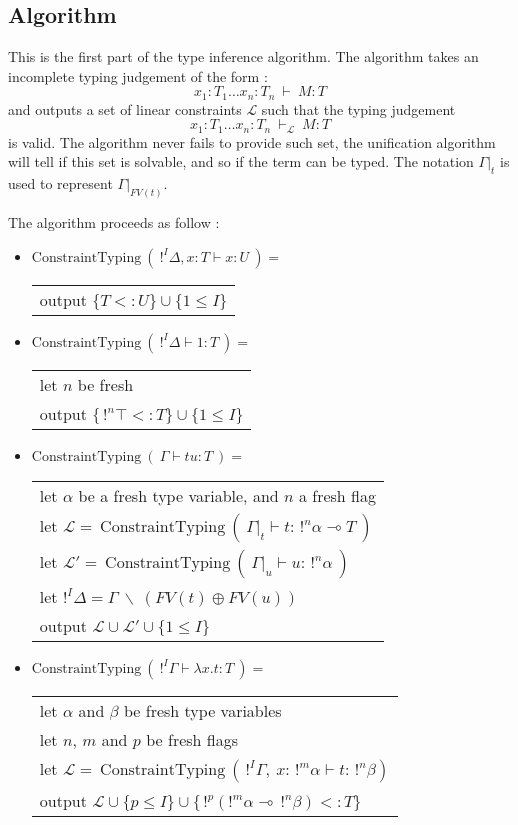 \documentclass[10pt]{article}
\theoremstyle{plain}
\theoremstyle{definition}
\begin{document}
\subsection{Algorithm}

	This is the first part of the type inference algorithm.
	The algorithm takes an incomplete typing judgement of the form :
		$$x_1 : T_1 \dots x_n : T_n ~ \vdash ~ M : T$$
	and outputs a set of linear constraints $\mathcal{L}$ such that the typing judgement
	  $$x_1 : T_1 \dots x_n : T_n ~ \vdash_{\mathcal{L}} ~ M : T$$
	is valid. The algorithm never fails to provide such set, the unification algorithm will tell if this
	set is solvable, and so if the term can be typed.
	The notation $\Gamma|_t$ is used to represent $\Gamma|_{FV(t)}$.
	
	The algorithm proceeds as follow :
	\begin{itemize}
		\item $\text{ConstraintTyping} ~ (~ !^I \Delta, x : T \vdash x : U ~) = $ \\
		  \begin{tabular}{l}
				output $\{ T <: U \} \cup \{ 1 \le I \}$
		  \end{tabular}
		
		\item $\text{ConstraintTyping} ~ (~ !^I \Delta \vdash 1 : T ~) = $ \\
		  \begin{tabular}{l}
		  	let $n$ be fresh \\
				output $\{ \,!^n\top <: T \} \cup \{ 1 \le I \}$
		  \end{tabular}		
		  
		\item $\text{ConstraintTyping} ~ (~ \Gamma \vdash t u : T ~) = $ \\
			\begin{tabular}{l}
				let $\alpha$ be a fresh type variable, and $n$ a fresh flag \\
				let $\mathcal{L} = ~ \text{ConstraintTyping} ~ (~ \Gamma|_t \vdash t : \, !^n\alpha \multimap T ~)$ \\
				let $\mathcal{L'} = ~ \text{ConstraintTyping} ~ ( ~ \Gamma|_u \vdash u : \, !^n\alpha ~)$ \\
				let $!^I\Delta = \Gamma ~ \backslash ~ (FV(t) \oplus FV(u))$ \\
				output $\mathcal{L \cup L'} \cup \{ 1 \le I \}$
			\end{tabular}
			
		\item $\text{ConstraintTyping} ~ (~ !^I \Gamma \vdash \lambda x.t : T ~) = $ \\
			\begin{tabular}{l}
				let $\alpha$ and $\beta$ be fresh type variables \\
				let $n$, $m$ and $p$ be fresh flags \\
				let $\mathcal{L} = ~ \text{ConstraintTyping} ~ ( \, !^I \Gamma, ~ x : \, !^m \alpha \vdash  t : \, !^n\beta)$ \\
				output $\mathcal{L} \cup \{ p \le I \} \cup \{ \, !^p (!^m \alpha \multimap \, !^n \beta) <: T\}$
			\end{tabular}
			

\end{itemize}
\end{document}
